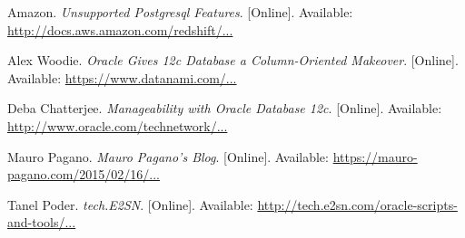 \documentclass[draftclsnofoot, onecolumn, compsoc, 10pt]{IEEEtran}
\begin{document}
\begin{thebibliography}{9}
Amazon.
\textit{Unsupported Postgresql Features}.
[Online].
Available: \href{http://docs.aws.amazon.com/redshift/latest/dg/c_unsupported-postgresql-features.html}{http://docs.aws.amazon.com/redshift/...}

Alex Woodie.
\textit{Oracle Gives 12c Database a Column-Oriented Makeover}.
[Online].
Available: \href{https://www.datanami.com/2013/09/23/oracle_gives_12c_database_a_column-oriented_makeover/}{https://www.datanami.com/...}


Deba Chatterjee.
\textit{Manageability with Oracle Database 12c}.
[Online].
Available: \href{http://www.oracle.com/technetwork/database/manageability/database-manageability-wp-12c-1964677.pdf}{http://www.oracle.com/technetwork/...}

Mauro Pagano.
\textit{Mauro Pagano's Blog}.
[Online].
Available: \href{https://mauro-pagano.com/2015/02/16/sqld360-sql-diagnostics-collection-made-faster/}{https://mauro-pagano.com/2015/02/16/...}

Tanel Poder.
\textit{tech.E2SN}.
[Online].
Available: \href{http://tech.e2sn.com/oracle-scripts-and-tools/session-snapper}{http://tech.e2sn.com/oracle-scripts-and-tools/...}

\end{thebibliography}
\end{document}
